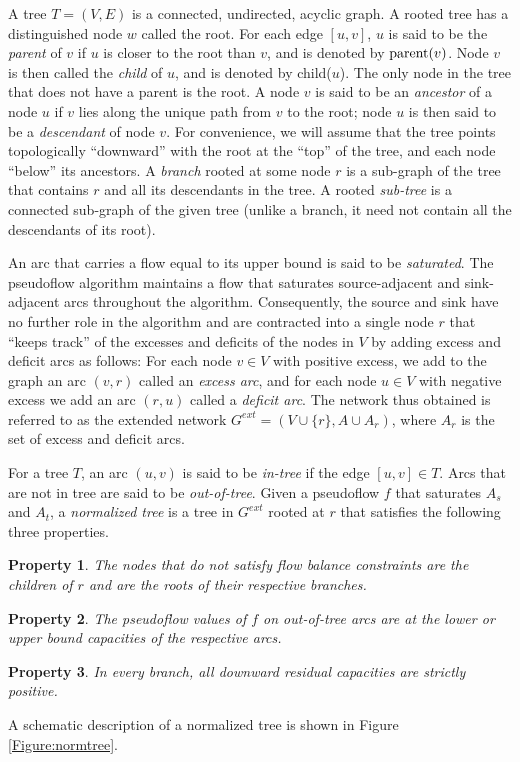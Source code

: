 \documentclass{article}
\newtheorem{property}{Property}[section]
\begin{document}
A tree $T = (V, E)$ is a connected, undirected, acyclic graph.  A rooted tree has a distinguished node $w$ called the root. For each edge $[u,v]$, $u$ is said to be the {\em parent} of $v$ if $u$ is closer to the root than $v$, and is denoted by ${\rm parent}(v)$. Node $v$ is then called the {\em child} of $u$, and is denoted by child($u$). The only node in the tree that does not have a parent is the root. A node $v$ is said to be an {\em ancestor} of a node $u$ if $v$ lies along the unique path from $v$ to the root; node $u$ is then said to be a {\em descendant} of node $v$. For convenience, we will assume that the tree points topologically ``downward'' with the root at the ``top'' of the tree, and each node ``below'' its ancestors. A {\em branch} rooted at some node $r$ is a sub-graph of the tree that contains $r$ and all its descendants in the tree.  A rooted {\em sub-tree} is a connected sub-graph of the given tree (unlike a branch, it need not contain all the descendants of its root). 

An arc that carries a flow equal to its upper bound is said to be {\em saturated}.  The pseudoflow algorithm maintains a flow that saturates source-adjacent and sink-adjacent arcs throughout the algorithm. Consequently, the source and sink have no further role in the algorithm and are contracted into a single node $r$ that ``keeps track'' of the excesses and deficits of the nodes in $V$ by adding excess and deficit arcs as follows: For each node $v \in V$ with positive excess, we add to the graph an arc $(v,r)$ called an {\em excess arc}, and for each node $u \in V$ with negative excess we add an arc $(r,u)$ called a {\em deficit arc}. The network thus obtained is referred to as the extended network $G^{ext} = (V \cup \{r\}, A \cup A_r)$, where $A_r$ is the set of excess and deficit arcs.

For a tree $T$, an arc $(u,v)$ is said to be {\em in-tree} if the edge $[u,v]\in T$. Arcs that are not in tree are said to be {\em out-of-tree}.  Given a pseudoflow $f$ that saturates $A_s$ and $A_t$, a {\em normalized tree} is a tree in $G^{ext}$ rooted at $r$ that satisfies the following three properties. 
\begin{property}
\label{property:normtreeroot}
The nodes that do not satisfy flow balance constraints are the children of $r$ and are the roots of their respective branches.
\end{property}
\begin{property}
\label{property:normtreeoutoftree}
The pseudoflow values of $f$ on out-of-tree arcs are at the lower or upper bound capacities of the respective arcs.
\end{property}
\begin{property}
\label{property:normtreedownward}
In every branch, all downward residual capacities are strictly positive.
\end{property}
A schematic description of a normalized tree is shown in Figure \ref{Figure:normtree}.
\end{document}
